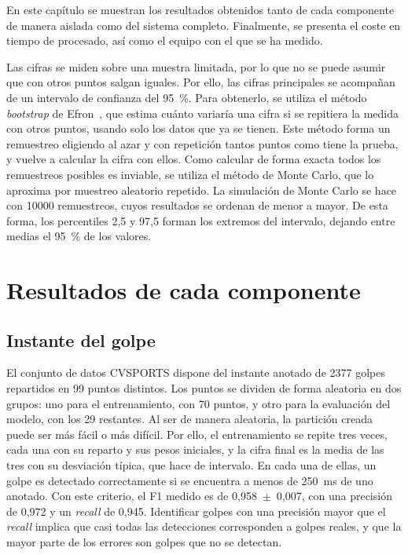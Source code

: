 
En este capítulo se muestran los resultados obtenidos tanto de cada componente de manera aislada como del sistema completo.
Finalmente, se presenta el coste en tiempo de procesado, así como el equipo con el que se ha medido.

Las cifras se miden sobre una muestra limitada, por lo que no se puede asumir que con otros puntos salgan iguales.
Por ello, las cifras principales se acompañan de un intervalo de confianza del 95~\%.
Para obtenerlo, se utiliza el método \textit{bootstrap} de Efron~\cite{efron1979bootstrap}, que estima cuánto variaría una cifra si se repitiera la medida con otros puntos, usando solo los datos que ya se tienen.
Este método forma un remuestreo eligiendo al azar y con repetición tantos puntos como tiene la prueba, y vuelve a calcular la cifra con ellos.
Como calcular de forma exacta todos los remuestreos posibles es inviable, se utiliza el método de Monte Carlo, que lo aproxima por muestreo aleatorio repetido.
La simulación de Monte Carlo se hace con \num{10000} remuestreos, cuyos resultados se ordenan de menor a mayor.
De esta forma, los percentiles 2,5 y 97,5 forman los extremos del intervalo, dejando entre medias el 95~\% de los valores.

\section{Resultados de cada componente}
\label{sec:resultados-componentes}

\subsection{Instante del golpe}
\label{sec:resultados-instante}

El conjunto de datos CVSPORTS dispone del instante anotado de 2377 golpes repartidos en 99 puntos distintos.
Los puntos se dividen de forma aleatoria en dos grupos: uno para el entrenamiento, con 70 puntos, y otro para la evaluación del modelo, con los 29 restantes.
Al ser de manera aleatoria, la partición creada puede ser más fácil o más difícil.
Por ello, el entrenamiento se repite tres veces, cada una con su reparto y sus pesos iniciales, y la cifra final es la media de las tres con su desviación típica, que hace de intervalo.
En cada una de ellas, un golpe es detectado correctamente si se encuentra a menos de 250~ms de uno anotado.
Con este criterio, el F1 medido es de 0,958~$\pm$~0,007, con una precisión de 0,972 y un \textit{recall} de 0,945.
Identificar golpes con una precisión mayor que el \textit{recall} implica que casi todas las detecciones corresponden a golpes reales, y que la mayor parte de los errores son golpes que no se detectan.

